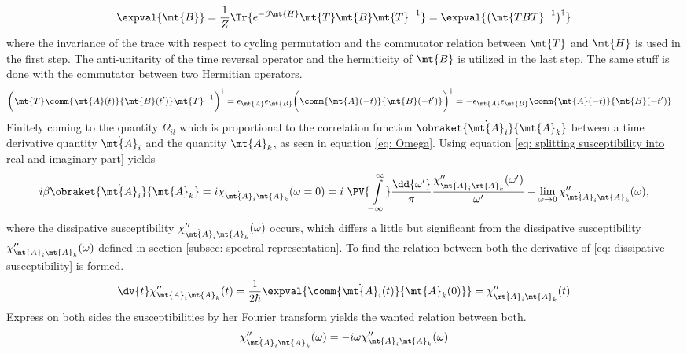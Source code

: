 %
\begin{align}
	\expval{\mt{B}} = \frac{1}{Z} \Tr{e^{-\beta \mt{H}} \mt{T} \mt{B} \mt{T}^{-1}} = \expval{\big(\mt{TBT}^{-1}\big)^{\dag}}
	\label{eq: time reversal expectation value}
\end{align}
%
where the invariance of the trace with respect to cycling permutation and the commutator relation between $\mt{T}$ and $\mt{H}$ is used in the first step.
The anti-unitarity of the time reversal operator and the hermiticity of $\mt{B}$ is utilized in the last step.
The same stuff is done with the commutator between two Hermitian operators.
%
\begin{align}
	\bigg(\mt{T} \comm{\mt{A}(t)}{\mt{B}(t')} \mt{T}^{-1}\bigg)^{\dag} &= \epsilon_{\mt{A}} \epsilon_{\mt{B}} \bigg(\comm{\mt{A}(-t)}{\mt{B}(-t')}\bigg)^{\dag} = - \epsilon_{\mt{A}} \epsilon_{\mt{B}} \comm{\mt{A}(-t)}{\mt{B}(-t')}
	\label{eq: time reversal commutator}
\end{align}
%
Finitely coming to the quantity $\Omega_{il}$ which is proportional to the correlation function $\obraket{\dot{\mt{A}}_{i}}{\mt{A}_{k}}$ between a time derivative quantity $\dot{\mt{A}}_{i}$ and the quantity $\mt{A}_{k}$, as seen in equation \eqref{eq: Omega}.
Using equation \eqref{eq: splitting susceptibility into real and imaginary part} yields
%
\begin{align}
	i \beta \obraket{\dot{\mt{A}}_{i}}{\mt{A}_{k}} = i \chi_{\dot{\mt{A}}_{i} \mt{A}_{k}}(\omega=0) = i\ \PV{\int\limits_{-\infty}^{\infty}} \frac{\dd{\omega'}}{\pi} \frac{\chi''_{\dot{\mt{A}}_{i} \mt{A}_{k}}(\omega')}{\omega'} - \lim\limits_{\omega \to 0} \chi''_{\dot{\mt{A}}_{i} \mt{A}_{k}}(\omega),
\end{align}
%
where the dissipative susceptibility $\chi''_{\dot{\mt{A}}_{i} \mt{A}_{k}}(\omega)$ occurs, which differs a little but significant from the dissipative susceptibility $\chi''_{\mt{A}_{i} \mt{A}_{k}}(\omega)$ defined in section \ref{subsec: spectral representation}.
To find the relation between both the derivative of \eqref{eq: dissipative susceptibility} is formed.
%
\begin{align}
	\dv{t} \chi''_{\mt{A}_{i} \mt{A}_{k}}(t) = \frac{1}{2\hbar} \expval{\comm{\dot{\mt{A}}_{i}(t)}{\mt{A}_{k}(0)}} = \chi''_{\dot{\mt{A}}_{i} \mt{A}_{k}}(t)
\end{align}
%
Express on both sides the susceptibilities by her Fourier transform yields the wanted relation between both.
%
\begin{align}
	\chi''_{\dot{\mt{A}}_{i} \mt{A}_{k}}(\omega) = - i \omega \chi''_{\mt{A}_{i} \mt{A}_{k}}(\omega)
\end{align}
